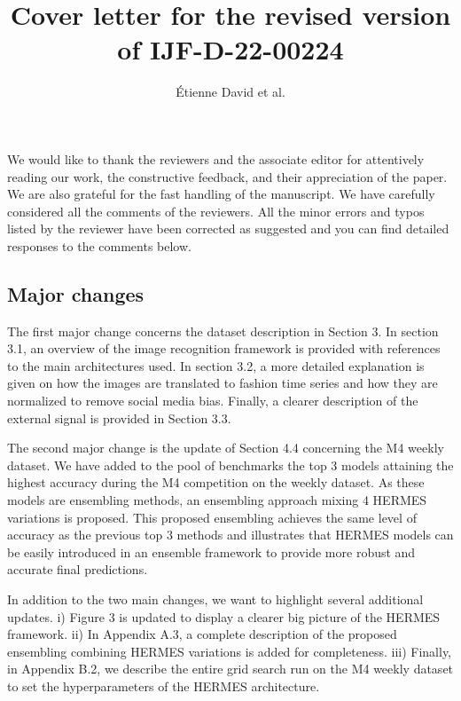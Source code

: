 \documentclass[11pt]{article}
\title{Cover letter for the revised version of IJF-D-22-00224}
\author{\'Etienne David et al.}
\begin{document}
\maketitle

We would like to thank the reviewers and the associate editor for attentively reading our work, the constructive feedback, and their appreciation of the paper. We are also grateful for the fast handling of the manuscript.
We have carefully considered all the comments of the reviewers. All the minor errors and typos listed by the reviewer have been corrected as suggested and you can find detailed responses to the comments below.

\subsection*{Major changes}

The first major change concerns the dataset description in Section 3. In section 3.1, an overview of the image recognition framework is provided with references to the main architectures used. In section 3.2, a more detailed explanation is given on how the images are translated to fashion time series and how they are normalized to remove social media bias. Finally, a clearer description of the external signal is provided in Section 3.3.

The second major change is the update of Section 4.4 concerning the M4 weekly dataset. We have added to the pool of benchmarks the top 3 models attaining the highest accuracy during the M4 competition on the weekly dataset. As these models are ensembling methods, an ensembling approach mixing 4 HERMES variations is proposed. This proposed ensembling achieves the same level of accuracy as the previous top 3 methods and illustrates that HERMES models can be easily introduced in an ensemble framework to provide more robust and accurate final predictions. 

In addition to the two main changes, we want to highlight several additional updates. i) Figure 3 is updated to display a clearer big picture of the HERMES framework. ii) In Appendix A.3, a complete description of the proposed ensembling combining HERMES variations is added for completeness. iii) Finally, in Appendix B.2, we describe the entire grid search run on the M4 weekly dataset to set the hyperparameters of the HERMES architecture.
\end{document}
